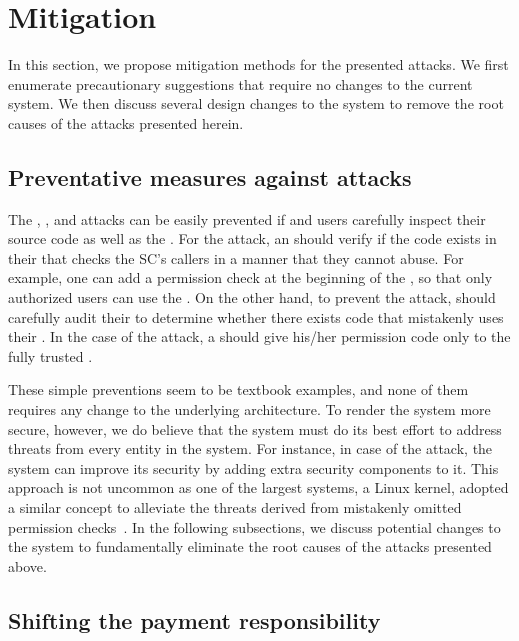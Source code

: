 \chapter{Mitigation}
\label{s:mit}

In this section, we propose mitigation methods for the presented attacks. We
first enumerate precautionary suggestions that require no changes to the current
\eos system. We then discuss several design changes to the \eos system to remove
the root causes of the attacks presented herein.


\section{Preventative measures against attacks}
\label{ss:simple}

The \TESER, \SCPDOS, and \TOCTOU attacks can be easily prevented if \SCPs and
users carefully inspect their \SC source code as well as the \SCPs.
%
For the \TESER attack, an \SCP should verify if the code exists in their \SC that checks the SC's callers in a manner that they cannot abuse.
%
For example, one can add a permission check at the beginning of the \SC, so that
only authorized users can use the \SC.
%
On the other hand, to prevent the \SCPDOS attack, \SCPs should carefully audit their 
\SCs to determine whether there exists code that mistakenly uses their \ram.
%
In the case of the \TOCTOU attack, a \user should give his/her permission code 
only to the fully trusted \SCPs.

These simple preventions seem to be textbook examples, and none of them requires
any change to the underlying \PLATFORM architecture. To render the system more
secure, however, we do believe that the system must do its best effort to address
threats from every entity in the system.
%
For instance, in case of the \TESER attack, the \eos system can improve its security by
adding extra security components to it.
%
This approach is not uncommon as one of the largest systems, a Linux kernel,
adopted a similar concept to alleviate the threats derived from mistakenly
omitted permission checks~\cite{mcclure2009hacking}.
%
In the following subsections, we discuss potential changes to the \eos system to
fundamentally eliminate the root causes of the attacks presented above.

\section{Shifting the payment responsibility}
\label{ss:shifting}

